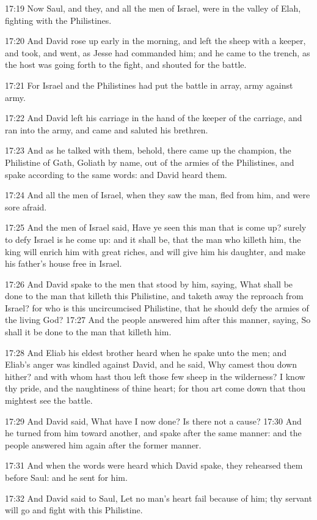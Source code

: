 17:19 Now Saul, and they, and all the men of Israel, were in the
valley of Elah, fighting with the Philistines.

17:20 And David rose up early in the morning, and left the sheep with
a keeper, and took, and went, as Jesse had commanded him; and he came
to the trench, as the host was going forth to the fight, and shouted
for the battle.

17:21 For Israel and the Philistines had put the battle in array, army
against army.

17:22 And David left his carriage in the hand of the keeper of the
carriage, and ran into the army, and came and saluted his brethren.

17:23 And as he talked with them, behold, there came up the champion,
the Philistine of Gath, Goliath by name, out of the armies of the
Philistines, and spake according to the same words: and David heard
them.

17:24 And all the men of Israel, when they saw the man, fled from him,
and were sore afraid.

17:25 And the men of Israel said, Have ye seen this man that is come
up?  surely to defy Israel is he come up: and it shall be, that the
man who killeth him, the king will enrich him with great riches, and
will give him his daughter, and make his father's house free in
Israel.

17:26 And David spake to the men that stood by him, saying, What shall
be done to the man that killeth this Philistine, and taketh away the
reproach from Israel? for who is this uncircumcised Philistine, that
he should defy the armies of the living God?  17:27 And the people
answered him after this manner, saying, So shall it be done to the man
that killeth him.

17:28 And Eliab his eldest brother heard when he spake unto the men;
and Eliab's anger was kindled against David, and he said, Why camest
thou down hither? and with whom hast thou left those few sheep in the
wilderness? I know thy pride, and the naughtiness of thine heart; for
thou art come down that thou mightest see the battle.

17:29 And David said, What have I now done? Is there not a cause?
17:30 And he turned from him toward another, and spake after the same
manner: and the people answered him again after the former manner.

17:31 And when the words were heard which David spake, they rehearsed
them before Saul: and he sent for him.

17:32 And David said to Saul, Let no man's heart fail because of him;
thy servant will go and fight with this Philistine.

